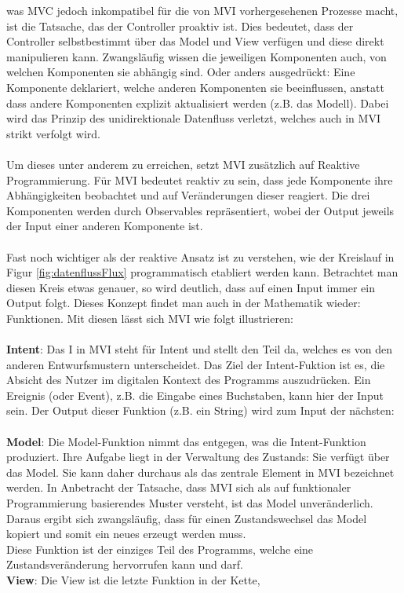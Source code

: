 was MVC jedoch inkompatibel für die von MVI vorhergesehenen Prozesse macht, ist die Tatsache, das der Controller proaktiv ist. Dies bedeutet, dass der Controller selbstbestimmt über das Model und View verfügen und diese direkt manipulieren kann. Zwangsläufig wissen die jeweiligen Komponenten auch, von welchen Komponenten sie abhängig sind. Oder anders ausgedrückt: Eine Komponente deklariert, welche anderen Komponenten sie beeinflussen, anstatt dass andere Komponenten explizit aktualisiert werden (z.B. das Modell). Dabei wird das Prinzip des unidirektionale Datenfluss verletzt, welches auch in MVI strikt verfolgt wird. 
\\
\\
Um dieses unter anderem zu erreichen, setzt MVI zusätzlich auf Reaktive Programmierung. Für MVI bedeutet reaktiv zu sein, dass jede Komponente ihre Abhängigkeiten beobachtet und auf Veränderungen dieser reagiert. Die drei Komponenten werden durch Observables repräsentiert, wobei der Output jeweils der Input einer anderen Komponente ist.
\\
\\
Fast noch wichtiger als der reaktive Ansatz ist zu verstehen, wie der Kreislauf in Figur \ref{fig:datenflussFlux} programmatisch etabliert werden kann. Betrachtet man diesen Kreis etwas genauer, so wird deutlich, dass auf einen Input immer ein Output folgt. Dieses Konzept findet man auch in der Mathematik wieder: Funktionen. Mit diesen lässt sich MVI wie folgt illustrieren:
\\
\\
\textbf{Intent}: Das I in MVI steht für Intent und stellt den Teil da, welches es von den anderen Entwurfsmustern unterscheidet. Das Ziel der Intent-Fuktion ist es, die Absicht des Nutzer im digitalen Kontext des Programms auszudrücken.
Ein Ereignis (oder Event), z.B. die Eingabe eines Buchstaben, kann hier der Input sein.
Der Output dieser Funktion (z.B. ein String) wird zum Input der nächsten:
\\
\\
\textbf{Model}: Die Model-Funktion nimmt das entgegen, was die Intent-Funktion produziert. Ihre Aufgabe liegt in der Verwaltung des Zustands: Sie verfügt über das Model. Sie kann daher durchaus als das zentrale Element in MVI bezeichnet werden. In Anbetracht der Tatsache, dass MVI sich als auf funktionaler Programmierung basierendes Muster versteht, ist das Model unveränderlich. Daraus ergibt sich zwangsläufig, dass für einen Zustandswechsel das Model kopiert und somit ein neues erzeugt werden muss. 
\\
Diese Funktion ist der einziges Teil des Programms, welche eine Zustandsveränderung hervorrufen kann und darf.
\\
\textbf{View}: Die View ist die letzte Funktion in der Kette, 